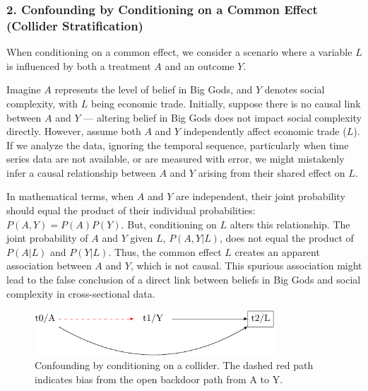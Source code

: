 \documentclass[
  singlecolumn,
  9pt]{article}
\begin{document}
\subsubsection{2. Confounding by Conditioning on a Common Effect
(Collider
Stratification)}\label{confounding-by-conditioning-on-a-common-effect-collider-stratification}

When conditioning on a common effect, we consider a scenario where a
variable \(L\) is influenced by both a treatment \(A\) and an outcome
\(Y\).

Imagine \(A\) represents the level of belief in Big Gods, and \(Y\)
denotes social complexity, with \(L\) being economic trade. Initially,
suppose there is no causal link between \(A\) and \(Y\) --- altering
belief in Big Gods does not impact social complexity directly. However,
assume both \(A\) and \(Y\) independently affect economic trade (\(L\)).
If we analyze the data, ignoring the temporal sequence, particularly
when time series data are not available, or are measured with error, we
might mistakenly infer a causal relationship between \(A\) and \(Y\)
arising from their shared effect on \(L\).

In mathematical terms, when \(A\) and \(Y\) are independent, their joint
probability should equal the product of their individual probabilities:
\(P(A, Y) = P(A)P(Y)\). But, conditioning on \(L\) alters this
relationship. The joint probability of \(A\) and \(Y\) given \(L\),
\(P(A, Y | L)\), does not equal the product of \(P(A | L)\) and
\(P(Y | L)\). Thus, the common effect \(L\) creates an apparent
association between \(A\) and \(Y\), which is not causal. This spurious
association might lead to the false conclusion of a direct link between
beliefs in Big Gods and social complexity in cross-sectional data.

\begin{figure}

{\centering \includegraphics[width=0.8\textwidth,height=\textheight]{causal-dags_files/figure-pdf/fig-dag-common-effect-1.pdf}

}

\caption{\label{fig-dag-common-effect}Confounding by conditioning on a
collider. The dashed red path indicates bias from the open backdoor path
from A to Y.}

\end{figure}
\end{document}
